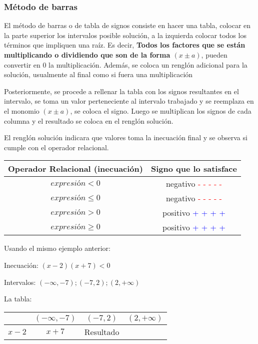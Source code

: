 \documentclass[12pt]{article}
\newcommand{\p}{\textcolor{Blue}{+ + + +}}
\newcommand{\n}{\textcolor{Red}{- - - - -}}
\begin{document}
   \subsubsection{Método de barras} \label{Metodo-de-barras}

   El método de barras o de tabla de signos consiste en hacer una tabla, colocar
   en la parte superior los intervalos posible solución, a la izquierda colocar
   todos los términos que impliquen una raíz. Es decir, \textbf{Todos los factores
   que se están multiplicando o dividiendo que son de la forma $(x\pm a) $},
   pueden convertir en 0 la multiplicación. Además, se coloca  un renglón adicional
   para la solución, usualmente al final como si fuera una multiplicación

   Posteriormente, se procede a rellenar la tabla con los signos resultantes en
   el intervalo, se toma un valor perteneciente al intervalo trabajado
   y se reemplaza en el monomio $(x\pm a) $, se coloca el signo. Luego se
   multiplican los signos de cada columna y el resultado se coloca en el renglón
   solución.

    El renglón solución indicara que valores toma la inecuación final y se observa
    si cumple con el operador relacional.

    \vspace*{1cm}
    \begin{tabular}{|c|c|}
        \hline
        Operador Relacional (inecuación)    &  Signo que lo satisface\\\hline
        $expresión<0 $                      &  negativo \n \\\hline
        $ expresión\leq0 $                  &  negativo \n \\\hline
        $expresión>0$                       &  positivo \p \\\hline
        $ expresión\geq0 $                  &  positivo \p \\\hline
    \end{tabular}

    \vspace*{1cm}
    Usando el mismo ejemplo anterior:

    Inecuación: $ (x-2)(x+7) < 0 $

    Intervalos: $ \displaystyle (-\infty,-7);(-7,2);(2,+\infty)$

    La tabla:

    \vspace*{1cm}
    \begin{tabular}{|c|c|c|c|}
              & $(-\infty,-7)$ & $(-7,2)$ & $(2,+\infty)$\\\hline
        $x-2$ &
        $x+7$ &
    Resultado &
    \end{tabular}
\end{document}
